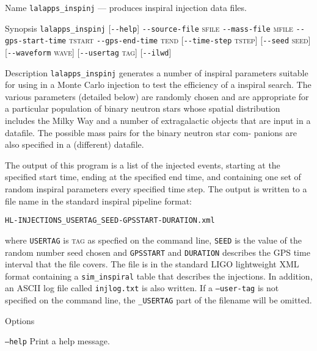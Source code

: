 \begin{entry}
\item[Name]
\verb$lalapps_inspinj$ --- produces inspiral injection data files.

\item[Synopsis]
\verb$lalapps_inspinj$ 
[\verb$--help$]
\verb$--source-file$ \textsc{sfile}
\verb$--mass-file$ \textsc{mfile}
\verb$--gps-start-time$ \textsc{tstart} 
\verb$--gps-end-time$ \textsc{tend} 
[\verb$--time-step$ \textsc{tstep}]
[\verb$--seed$ \textsc{seed}]
[\verb$--waveform$ \textsc{wave}]
[\verb$--usertag$ \textsc{tag}]
[\verb$--ilwd$]

\item[Description] 
\verb$lalapps_inspinj$
generates a number of inspiral  parameters suitable  for using in a Monte
Carlo injection to test the efficiency of a inspiral search.  The  various
parameters (detailed  below)  are randomly chosen and are appropriate for a
particular population of binary neutron stars  whose spatial  distribution
includes the Milky Way and a number of extragalactic objects that are  input
in  a  datafile.  The  possible  mass pairs for the binary neutron star com-
panions are also specified in a (different) datafile.

The output of this program  is  a  list  of  the  injected events,  starting
at  the specified start time, ending at the specified end time, and containing
one set  of  random inspiral parameters every specified time step.  The output
is written to a file name in the standard inspiral pipeline format:
\begin{center}
\begin{verbatim}
HL-INJECTIONS_USERTAG_SEED-GPSSTART-DURATION.xml
\end{verbatim}
\end{center}
where \verb$USERTAG$ is \textsc{tag} as specfied on the command line, 
\verb$SEED$ is the  value  of  the random number seed chosen and 
\verb$GPSSTART$ and \verb$DURATION$ describes the GPS time interval that
the file covers. The file is in the standard LIGO lightweight XML format
containing a \texttt{sim\_inspiral} table that describes the injections.
In addition, an ASCII log file called \verb$injlog.txt$ is also written.
If a \texttt{--user-tag} is not specified on the command line, the
\texttt{\_USERTAG} part of the filename will be omitted.

\item[Options]\leavevmode
\begin{entry}
\item[\texttt{--help}] Print a help message.


\end{entry}
\end{entry}
